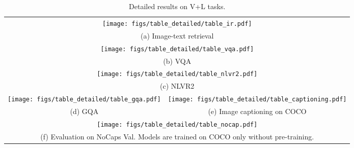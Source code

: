 \documentclass[runningheads]{llncs}
\begin{document}
\begin{table*}[t!]
\begin{center}
\scriptsize
\caption{Detailed results on V+L tasks.}
\label{tab:detailed_result}
\begin{tabular}{cc}
\multicolumn{2}{c}{\texttt{[image: figs/table\_detailed/table\_ir.pdf]}} \\
\multicolumn{2}{c}{(a) Image-text retrieval} \vspace{1mm} \\
\multicolumn{2}{c}{\texttt{[image: figs/table\_detailed/table\_vqa.pdf]}} \\
\multicolumn{2}{c}{(b) VQA} \vspace{1mm}  \\
\multicolumn{2}{c}{\texttt{[image: figs/table\_detailed/table\_nlvr2.pdf]}} \\
\multicolumn{2}{c}{(c) NLVR2} \vspace{1mm}  \\
\texttt{[image: figs/table\_detailed/table\_gqa.pdf]}
& 
\texttt{[image: figs/table\_detailed/table\_captioning.pdf]} \\
(d) GQA & (e) Image captioning on COCO \vspace{1mm} \\
\multicolumn{2}{c}{\texttt{[image: figs/table\_detailed/table\_nocap.pdf]}}\\
\multicolumn{2}{c}{(f) Evaluation on NoCaps Val. Models are trained on COCO only without pre-training.}
\vspace{-5mm}
\end{tabular}
\end{center}
\end{table*}
\end{document}
